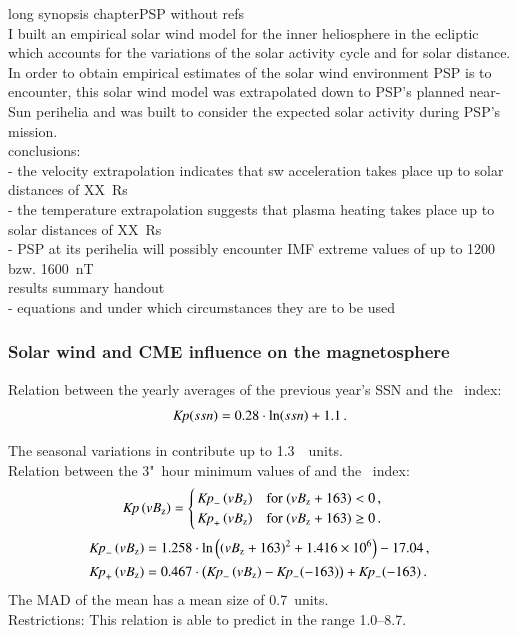 long synopsis chapterPSP without refs\\

I built an empirical solar wind model for the inner heliosphere in the ecliptic which accounts for the variations of the solar activity cycle and for solar distance. In order to obtain empirical estimates of the solar wind environment PSP is to encounter, this solar wind model was extrapolated down to PSP's planned near-Sun perihelia and was built to consider the expected solar activity during PSP's mission.\\

conclusions:\\
- the velocity extrapolation indicates that sw acceleration takes place up to solar distances of XX~Rs\\
- the temperature extrapolation suggests that plasma heating takes place up to solar distances of XX~Rs\\
- PSP at its perihelia will possibly encounter IMF extreme values of up to 1200 bzw. 1600~nT\\


results summary handout\\
- equations and under which circumstances they are to be used\\


\subsubsection*{Solar wind and CME influence on the magnetosphere}

Relation between the yearly averages of the previous year's SSN and the \Kp~index:
\begin{align}
	\textit{Kp}(ssn) = 0.28 \cdot \ln(ssn) + 1.1	\,.
\end{align}

The seasonal variations in \Kp{} contribute up to 1.3~\Kp~units.\\

Relation between the 3"~hour minimum values of \vBz{} and the \Kp~index:
\begin{align*}
	\text{\textit{Kp}}\left(vB_\text{z}\right) &=
	\begin{cases}
		\,\text{\textit{Kp}}_-\left(vB_\text{z}\right) &\text{for } (vB_\text{z} + 163) < 0	\,,\\
		\,\text{\textit{Kp}}_+\left(vB_\text{z}\right) &\text{for } (vB_\text{z} + 163) \ge 0	\,.
	\end{cases}
\end{align*}
\begin{align*}
	\text{\textit{Kp}}_-\left(vB_\text{z}\right) &= 1.258 \cdot \ln\left(\left(vB_\text{z} + 163\right)^2 + \num{1.416e6}\right) - 17.04	\,,\\
	\text{\textit{Kp}}_+\left(vB_\text{z}\right) &= 0.467 \cdot \left(\text{\textit{Kp}}_-\left(vB_\text{z}\right) - \text{\textit{Kp}}_-(-163)\right) + \text{\textit{Kp}}_-(-163)	\,.
\end{align*}
The MAD of the mean has a mean size of \SI{0.7}{\Kp}~units.\\
Restrictions: This relation is able to predict \Kp{} in the range \numrange{1.0}{8.7}.\\

